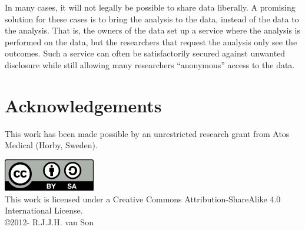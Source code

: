 \documentclass[10pt, a4paper]{article}
\newcommand{\YEAR}{\the\year}
\begin{document}
In many cases, it will not legally be possible to share data liberally. A promising solution for these cases is to bring the analysis to the data, instead of the data to the analysis. That is, the owners of the data set up a service where the analysis is performed on the data, but the researchers that request the analysis only see the outcomes. Such a service can often be satisfactorily secured against unwanted disclosure while still allowing many researchers ``anonymous'' access to the data.

\section{Acknowledgements}

This work has been made possible by an unrestricted research grant from Atos Medical (Horby, Sweden).


 

\vskip 3cm
\begin{center}
\includegraphics[width=0.3\textwidth]{Pictures/CC-share-alike}\\
This work is licensed under a Creative Commons Attribution-ShareAlike 4.0 International License.\\
\copyright 2012-{\YEAR}  R.J.J.H. van Son
\end{center}
\end{document}
